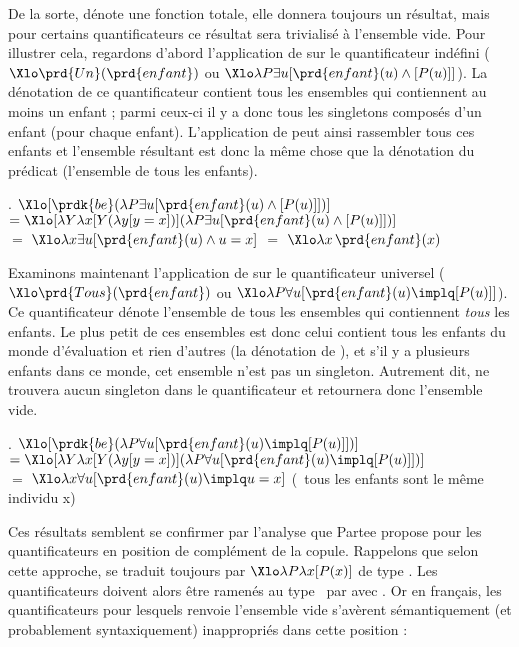 De la sorte,  dénote une fonction totale, elle donnera toujours un résultat, mais pour certains quantificateurs ce résultat sera trivialisé à l'ensemble vide. 
Pour illustrer cela, regardons d'abord l'application de  sur le quantificateur indéfini  (\ie\ $\Xlo\prd{Un}(\prd{enfant})$ ou $\Xlo\lambda P\exists u[\prd{enfant}(u)\wedge[P(u)]]$).  La dénotation de ce quantificateur contient tous les ensembles qui contiennent au moins un enfant ; parmi ceux-ci il y a donc tous les singletons composés d'un enfant (pour chaque enfant).  L'application de  peut ainsi rassembler tous ces enfants et l'ensemble résultant est donc la même chose que la dénotation du prédicat  (l'ensemble de tous les enfants).


\ex.
\({\Xlo[\prdk{be}(\lambda P\exists u[\prd{enfant}(u)\wedge[P(u)]])]}\)\\
\(=
{\Xlo[\lambda Y\lambda x [Y(\lambda y [y=x])](\lambda P\exists u[\prd{enfant}(u)\wedge[P(u)]])]}
\)
\\
$=$ 
\(\Xlo\lambda x \exists u [\prd{enfant}(u) \wedge u=x]\)
$=$
\(\Xlo\lambda x\,\prd{enfant}(x)\)


Examinons maintenant l'application de  sur le quantificateur universel  (\ie\ $\Xlo\prd{Tous}(\prd{enfant})$ ou $\Xlo\lambda P\forall u[\prd{enfant}(u)\implq[P(u)]]$).  Ce quantificateur dénote l'ensemble de tous les ensembles qui contiennent \emph{tous} les enfants.  Le plus petit de ces ensembles est donc celui contient tous les enfants du monde d'évaluation et rien d'autres (la dénotation de ), et s'il y a plusieurs enfants dans ce monde, cet ensemble n'est pas un singleton. Autrement dit,  ne trouvera aucun singleton dans le quantificateur et retournera donc l'ensemble vide. 

\ex.
\({\Xlo[\prdk{be}(\lambda P\forall u[\prd{enfant}(u)\implq[P(u)]])]}\)\\
\(=
{\Xlo[\lambda Y\lambda x [Y(\lambda y [y=x])](\lambda P\forall u[\prd{enfant}(u)\implq[P(u)]])]}
\)
\\
$=$ 
\(\Xlo\lambda x \forall u [\prd{enfant}(u) \implq u=x]\)
\quad (\ie\ tous les enfants sont le même individu \vrb x)


Ces résultats semblent se confirmer par l'analyse que Partee propose pour les quantificateurs en position de complément de la copule. 
Rappelons que selon cette approche,  se traduit toujours par $\Xlo\lambda P\lambda x[P(x)]$ de type \type{\et,\et}. Les quantificateurs doivent alors être ramenés au type \et\ par  avec .  Or en français, les quantificateurs pour lesquels  renvoie l'ensemble vide s'avèrent sémantiquement (et probablement syntaxiquement) inappropriés dans cette position :

